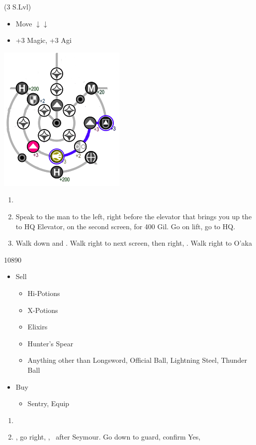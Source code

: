 \begin{spheregrid}
	\begin{itemize}
		\yunaf (3 S.Lvl)
		\begin{itemize}
			\item Move $\downarrow\downarrow$
			\item +3 Magic, +3 Agi
		\end{itemize}
		\includegraphics{graphics/Yuna_MRR_2}
	\end{itemize}
\end{spheregrid}
\begin{enumerate}[resume]
	\item \formation{\tidus}{\yuna}{\wakka}
	\item Speak to the man to the left, right before the elevator that brings you up the to HQ Elevator, on the second screen, for 400 Gil. Go on lift, go to HQ.
	\item Walk down and \sd. Walk right to next screen, then right, \sd. Walk right to O'aka
\end{enumerate}
\begin{shop}{10890}
	\begin{itemize}
		\item Sell
		      \begin{itemize}
			      \item Hi-Potions
			      \item X-Potions
			      \item Elixirs
			      \item Hunter's Spear
			      \item Anything other than Longsword, Official Ball, Lightning Steel, Thunder Ball
		      \end{itemize}
		\item Buy
		      \begin{itemize}
			      \item Sentry, Equip
		      \end{itemize}
	\end{itemize}
\end{shop}
\begin{enumerate}[resume]
	\item \save
	\item \sd, go right, \cs[1:00], \sd\ after Seymour. Go down to guard, confirm Yes, \sd
\end{enumerate}

